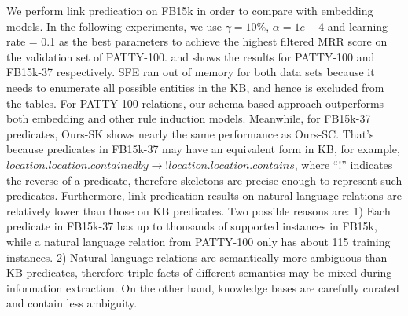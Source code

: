 We perform link predication on FB15k in order to compare with embedding models.
In the following experiments, we use $\gamma=10\%$, $\alpha=1e-4$ and learning rate = 0.1
as the best parameters to achieve the highest filtered MRR score
on the validation set of PATTY-100.
 and  shows
the results for PATTY-100 and FB15k-37 respectively.
SFE ran out of memory for both data sets because it needs to enumerate all
possible entities in the KB, and hence is excluded from the tables.
For PATTY-100 relations, our schema based approach outperforms
both embedding and other rule induction models.
Meanwhile, for FB15k-37 predicates, Ours-SK shows nearly the same performance as Ours-SC.
That's because predicates in FB15k-37 may have an equivalent form in KB,
for example, $location.location.containedby \rightarrow !location.location.contains$,
where ``$!$'' indicates the reverse of a predicate, therefore skeletons are precise
enough to represent such predicates.
Furthermore, link predication results on natural language relations are relatively lower
than those on KB predicates.
Two possible reasons are:
1) Each predicate in FB15k-37 has up to thousands of supported instances in FB15k,
while a natural language relation from PATTY-100 only has about 115 training instances.
2) Natural language relations are semantically more ambiguous than KB predicates,
therefore triple facts of different semantics may be mixed during information extraction.
On the other hand, knowledge bases are carefully curated and contain less ambiguity.

